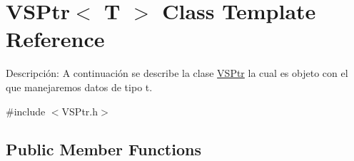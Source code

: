 \hypertarget{class_v_s_ptr}{}\section{V\+S\+Ptr$<$ T $>$ Class Template Reference}
\label{class_v_s_ptr}


Descripción\+: A continuación se describe la clase \hyperlink{class_v_s_ptr}{V\+S\+Ptr} la cual es objeto con el que manejaremos datos de tipo t.  




{\ttfamily \#include $<$V\+S\+Ptr.\+h$>$}

\subsection*{Public Member Functions}
